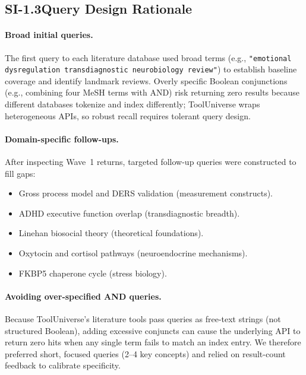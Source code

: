 \subsection*{SI-1.3\quad Query Design Rationale}

\paragraph{Broad initial queries.}
The first query to each literature database used broad terms (e.g.,
\texttt{"emotional dysregulation transdiagnostic neurobiology review"}) to
establish baseline coverage and identify landmark reviews.  Overly specific
Boolean conjunctions (e.g., combining four MeSH terms with AND) risk
returning zero results because different databases tokenize and index
differently; ToolUniverse wraps heterogeneous APIs, so robust recall
requires tolerant query design.

\paragraph{Domain-specific follow-ups.}
After inspecting Wave~1 returns, targeted follow-up queries were constructed
to fill gaps:
\begin{itemize}[nosep]
  \item Gross process model and DERS validation (measurement constructs).
  \item ADHD executive function overlap (transdiagnostic breadth).
  \item Linehan biosocial theory (theoretical foundations).
  \item Oxytocin and cortisol pathways (neuroendocrine mechanisms).
  \item FKBP5 chaperone cycle (stress biology).
\end{itemize}

\paragraph{Avoiding over-specified AND queries.}
Because ToolUniverse's literature tools pass queries as free-text strings
(not structured Boolean), adding excessive conjuncts can cause the
underlying API to return zero hits when any single term fails to match an
index entry.  We therefore preferred short, focused queries (2--4 key
concepts) and relied on result-count feedback to calibrate specificity.


